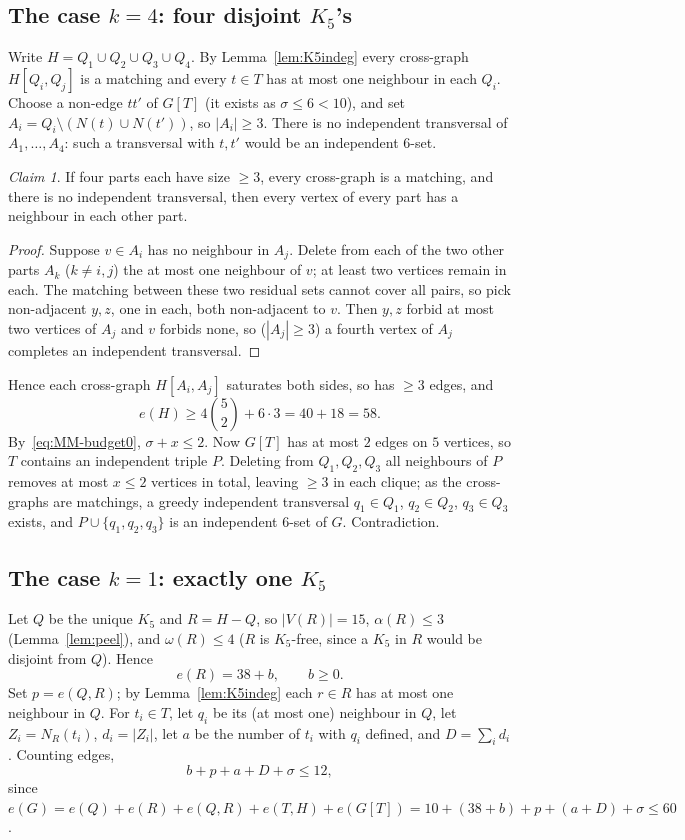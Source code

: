 \documentclass[11pt,reqno]{amsart}
\theoremstyle{definition}
\theoremstyle{remark}
\newtheorem*{claim}{Claim}
\newcommand{\abs}[1]{\left|#1\right|}
\begin{document}
\subsection{The case $k=4$: four disjoint $K_5$'s}
Write $H=Q_1\cup Q_2\cup Q_3\cup Q_4$. By Lemma~\ref{lem:K5indeg} every cross-graph
$H[Q_i,Q_j]$ is a matching and every $t\in T$ has at most one neighbour in each
$Q_i$. Choose a non-edge $tt'$ of $G[T]$ (it exists as $\sigma\le 6<10$), and set
$A_i=Q_i\setminus(N(t)\cup N(t'))$, so $\abs{A_i}\ge 3$. There is no independent
transversal of $A_1,\dots,A_4$: such a transversal with $t,t'$ would be an
independent $6$-set.

\begin{claim}
If four parts each have size $\ge 3$, every cross-graph is a matching, and there is
no independent transversal, then every vertex of every part has a neighbour in each
other part.
\end{claim}
\begin{proof}
Suppose $v\in A_i$ has no neighbour in $A_j$. Delete from each of the two other
parts $A_k$ ($k\ne i,j$) the at most one neighbour of $v$; at least two vertices
remain in each. The matching between these two residual sets cannot cover all pairs,
so pick non-adjacent $y,z$, one in each, both non-adjacent to $v$. Then $y,z$
forbid at most two vertices of $A_j$ and $v$ forbids none, so
($\abs{A_j}\ge 3$) a fourth vertex of $A_j$ completes an independent transversal.
\end{proof}

Hence each cross-graph $H[A_i,A_j]$ saturates both sides, so has $\ge 3$ edges, and
\[
  e(H)\ge 4\binom 52+6\cdot 3=40+18=58 .
\]
By~\eqref{eq:MM-budget0}, $\sigma+x\le 2$. Now $G[T]$ has at most $2$ edges on $5$
vertices, so $T$ contains an independent triple $P$. Deleting from $Q_1,Q_2,Q_3$
all neighbours of $P$ removes at most $x\le 2$ vertices in total, leaving $\ge 3$ in
each clique; as the cross-graphs are matchings, a greedy independent transversal
$q_1\in Q_1$, $q_2\in Q_2$, $q_3\in Q_3$ exists, and $P\cup\{q_1,q_2,q_3\}$ is an
independent $6$-set of $G$. Contradiction.

\subsection{The case $k=1$: exactly one $K_5$}
Let $Q$ be the unique $K_5$ and $R=H-Q$, so $\abs{V(R)}=15$, $\alpha(R)\le 3$
(Lemma~\ref{lem:peel}), and $\omega(R)\le 4$ ($R$ is $K_5$-free, since a $K_5$ in
$R$ would be disjoint from $Q$). Hence
\begin{equation}\label{eq:MM-eR}
  e(R)=38+b,\qquad b\ge 0 .
\end{equation}
Set $p=e(Q,R)$; by Lemma~\ref{lem:K5indeg} each $r\in R$ has at most one neighbour
in $Q$. For $t_i\in T$, let $q_i$ be its (at most one) neighbour in $Q$, let
$Z_i=N_R(t_i)$, $d_i=\abs{Z_i}$, let $a$ be the number of $t_i$ with $q_i$ defined,
and $D=\sum_i d_i$. Counting edges,
\begin{equation}\label{eq:MM-budget1}
  b+p+a+D+\sigma\le 12 ,
\end{equation}
since $e(G)=e(Q)+e(R)+e(Q,R)+e(T,H)+e(G[T])=10+(38+b)+p+(a+D)+\sigma\le 60$.
\end{document}
